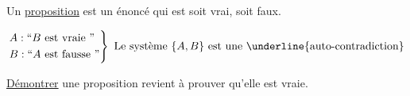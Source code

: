 \begin{defn}
	Un \underline{proposition} est un énoncé qui est soit vrai, soit faux.
\end{defn}

\begin{exm}
	\begin{align*}
		\begin{rcases*}
			A: ``B \text{ est vraie }"\\
			B: ``A \text{ est fausse }"\\
		\end{rcases*} \text{ Le système $\{A,B\}$ est une \underline{auto-contradiction}}
	\end{align*}
\end{exm}

\begin{defn}
	\underline{Démontrer} une proposition revient à prouver qu'elle est vraie.
\end{defn}
